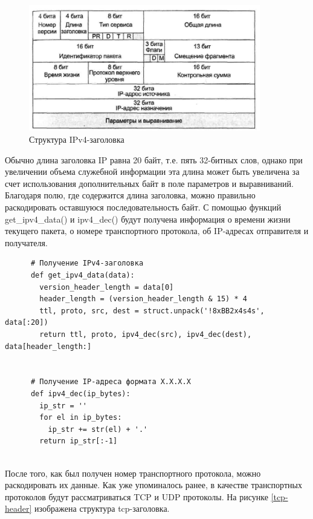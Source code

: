 \documentclass[bachelor, och, coursework]{SCWorks}
\begin{document}
    \begin{figure}[H]
      \centering
      \includegraphics[width=0.9\textwidth]{photo/ipv4-header.jpg}
      \caption{Структура IPv4-заголовка}
      \label{ipv4-header}
    \end{figure}
      
    Обычно длина заголовка IP равна 20 байт, т.е. пять 32-битных слов, однако при увеличении объема служебной информации эта длина может быть увеличена
    за счет использования дополнительных байт в поле параметров и выравниваний. Благодаря полю, где содержится
    длина заголовка, можно правильно раскодировать оставшуюся последовательность байт. С помощью функций get\_ipv4\_data() и ipv4\_dec() будут получена 
    информация о времени жизни текущего пакета, о номере транспортного протокола, об IP-адресах отправителя и получателя.
  
    \begin{verbatim}
      # Получение IPv4-заголовка
      def get_ipv4_data(data):
        version_header_length = data[0]
        header_length = (version_header_length & 15) * 4
        ttl, proto, src, dest = struct.unpack('!8xBB2x4s4s', data[:20])
        return ttl, proto, ipv4_dec(src), ipv4_dec(dest), data[header_length:]
      
      
      # Получение IP-адреса формата X.X.X.X
      def ipv4_dec(ip_bytes):
        ip_str = ''
        for el in ip_bytes:
          ip_str += str(el) + '.'
        return ip_str[:-1]
      
    \end{verbatim}

    После того, как был получен номер транспортного протокола, можно раскодировать их данные. Как уже упоминалось ранее, в качестве транспортных протоколов
    будут рассматриваться TCP и UDP протоколы. На рисунке \ref{tcp-header} изображена структура tcp-заголовка.
  
\end{document}
